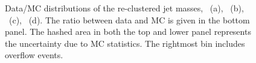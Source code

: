 		\begin{figure}[htbp]
		\centering
		\caption{Data/MC distributions of the re-clustered jet masses, \mantikttwelvezero~(a), \mantikttwelveone~(b), \mantikteightzero~(c), \mantikteightone~(d). The ratio between data and MC is given in the bottom panel. The hashed area in both the top and lower panel represents the uncertainty due to MC statistics. The rightmost bin includes overflow events.}
		\label{fig:ttVMasses} 
		\end{figure}

